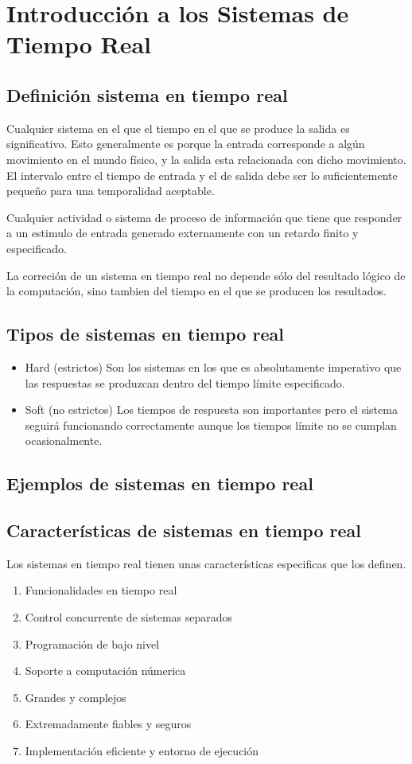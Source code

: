 \section{Introducción a los Sistemas de Tiempo Real}

\subsection{Definición sistema en tiempo real}

Cualquier sistema en el que el tiempo en el que se produce la salida es 
significativo. Esto generalmente es porque la entrada corresponde a algún 
movimiento en el mundo físico, y la salida esta relacionada con dicho 
movimiento. El intervalo entre el tiempo de entrada y el de salida debe ser
lo suficientemente pequeño para una temporalidad aceptable.

Cualquier actividad o sistema de proceso de información que tiene que responder
a un estimulo de entrada generado externamente con un retardo finito y
especificado.

La correción de un sistema en tiempo real no depende sólo del resultado 
lógico de la computación, sino tambien del tiempo en el que se producen los 
resultados.

\subsection{Tipos de sistemas en tiempo real}
\begin{itemize}
	\item Hard (estrictos) 
		Son los sistemas en los que es absolutamente imperativo
		que las respuestas se produzcan dentro del tiempo límite
		especificado.
	\item Soft (no estrictos)
		Los tiempos de respuesta son importantes pero el sistema
		seguirá funcionando correctamente aunque los tiempos límite
		no se cumplan ocasionalmente.
\end{itemize}
\subsection{Ejemplos de sistemas en tiempo real}

\subsection{Características de sistemas en tiempo real}

Los sistemas en tiempo real tienen unas características especificas que los
definen.

\begin{enumerate}
\item Funcionalidades en tiempo real
\item Control concurrente de sistemas separados
\item Programación de bajo nivel
\item Soporte a computación númerica
\item Grandes y complejos
\item Extremadamente fiables y seguros
\item Implementación eficiente y entorno de ejecución
\end{enumerate}
